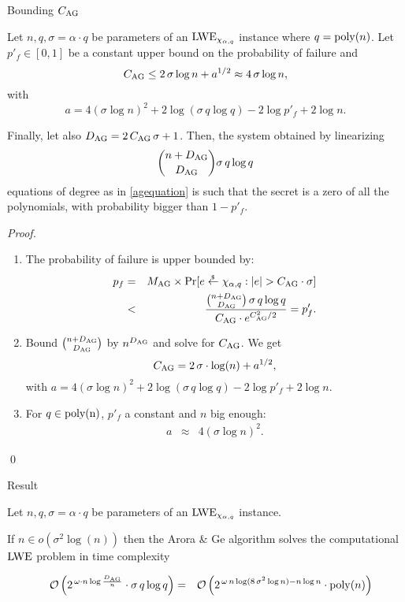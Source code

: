 \documentclass[10pt]{beamer}
\newcommand*{\neper}{e}
\newcommand{\AroraGe}{Arora \& Ge\xspace}
\newcommand{\prooffactor}{\ensuremath{\sigma \, q \log q}\xspace}
\newcommand{\bigO}[1]{\ensuremath{\mathcal{O}\left({#1}\right)}\xspace}
\newcommand{\poly}{ {\rm poly}(n)}
\newcommand{\chig}{\ensuremath{\chi_{\alpha,q}}}
\renewcommand{\Pr}{\textnormal{Pr}}
\def\rand{\stackrel{{}_{\$}}{\leftarrow}}
\newcommand\LWE{\ensuremath{{\rm LWE}}\xspace}
\def\DAG{D_{{\rm AG}}}
\def\MAG{M_{{\rm AG}}}
\def\CAG{C_{{\rm AG}}}
\begin{document}
\begin{frame}[allowframebreaks]{Bounding $\CAG$}

\begin{lemma}
\label{lem:arora-ge-cag} 
Let $n, q, \sigma=\alpha \cdot q$ be parameters of an $\LWE_{\chi_{\alpha,q}}$ instance where $q = \poly$. Let $p'_f \in [0,1]$ be a constant upper bound on the probability of failure and 
$$
\CAG \leq 2\, \sigma \log n +a^{1/2}\approx 4\, \sigma \log n,
$$
with  $$a= 4(\sigma \log n)^2+ 2\log(\prooffactor)-2\log p'_f +2\log n.$$

Finally, let also $\DAG=2\, \CAG\, \sigma+1$. Then, the system obtained by linearizing $$\binom{n+\DAG}{\DAG} \prooffactor$$ equations of degree as in \eqref{agequation} is such that the secret is a zero of all the polynomials, with probability bigger than $1-p'_f$. 

\end{lemma}

\framebreak

\begin{proof}
\begin{enumerate}
\item The probability of failure is upper bounded by:
\begin{eqnarray*}
p_f &=& \MAG \times \Pr [e \rand \chig : \left| e \right| >\CAG \cdot \sigma ]\\
    &<&       \frac{\binom{n+\DAG}{\DAG} \, \prooffactor}{\CAG\cdot \neper^{\CAG^2/2}} = p_f'.
\end{eqnarray*}
\item Bound $\binom{n+\DAG}{\DAG}$ by $n^{\DAG}$ and solve for $\CAG$. We get $$\CAG = 2\, \sigma \cdot \log(n)+a^{1/2},$$ with $a= 4(\sigma \log n)^2+ 2\log(\prooffactor)-2\log p'_f +2\log n$.
\item For $q \in {\rm poly(n)}$, $p'_f$ a constant and $n$ big enough: 
\begin{eqnarray*}
a &\approx& 4(\sigma \log n)^2. 
\end{eqnarray*}
\end{enumerate}\qed
\end{proof}

\end{frame}

\begin{frame}{Result}

\begin{theorem}
\label{thm:arora-ge-complexity}
Let $n,q,\sigma=\alpha \cdot q$ be parameters of an $\LWE_{\chi_{\alpha,q}}$ instance.

If $n \in o(\sigma^2\log(n))$ then the \AroraGe algorithm solves the computational \LWE{} problem in time complexity

\begin{eqnarray*}
& & \bigO{2^{\, \omega \cdot n \log \frac{\DAG}{n}} \cdot \prooffactor}
&=& \bigO{2^{\,\omega\, n\log(8\, \sigma^2 \log n) - n\log n} \cdot \poly}
\end{eqnarray*}
\end{theorem}

\end{frame}
	
\end{document}
